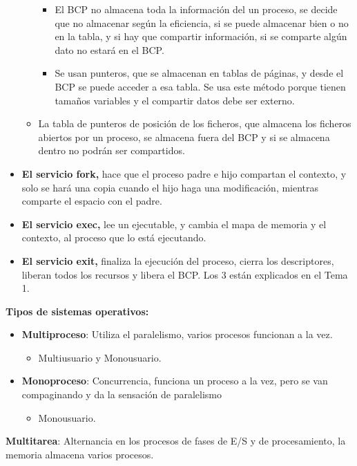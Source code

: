 \documentclass[12pt, twoside, openright]{report} %
\begin{document}
\begin{itemize}
\begin{itemize}
      \begin{itemize}
      \item El BCP no almacena toda la información del un proceso, se decide
        que no almacenar según la eficiencia, si se puede almacenar bien
        o no en la tabla, y si hay que compartir información, si se
        comparte algún dato no estará en el BCP.
        
      \item Se usan punteros, que se almacenan en tablas de páginas, y desde
        el BCP se puede acceder a esa tabla. Se usa este método porque
        tienen tamaños variables y el compartir datos debe ser externo.
        
      \end{itemize}
    \item La tabla de punteros de posición de los ficheros, que almacena los
      ficheros abiertos por un proceso, se almacena fuera del BCP y si se
      almacena dentro no podrán ser compartidos.
      
    \end{itemize}
  \item \textbf{El servicio fork,} hace que el proceso padre e hijo
    compartan el contexto, y solo se hará una copia cuando el hijo haga
    una modificación, mientras comparte el espacio con el padre.
    
  \item \textbf{El servicio exec,} lee un ejecutable, y cambia el mapa de
    memoria y el contexto, al proceso que lo está ejecutando.
    
  \item \textbf{El servicio exit,} finaliza la ejecución del proceso, cierra
    los descriptores, liberan todos los recursos y libera el BCP. Los 3
    están explicados en el Tema 1.
    
  \end{itemize}
\textbf{Tipos de sistemas operativos:}
  

  \begin{itemize}
  \item \textbf{Multiproceso}: Utiliza el paralelismo, varios procesos
    funcionan a la vez.
    

    \begin{itemize}
    \item Multiusuario y Monousuario.
      
    \end{itemize}
  \item \textbf{Monoproceso}: Concurrencia, funciona un proceso a la vez,
    pero se van compaginando y da la sensación de paralelismo
    

    \begin{itemize}
    \item Monousuario.
      
    \end{itemize}
  \end{itemize}
  \pagebreak
\textbf{Multitarea}: Alternancia en los procesos de fases de E/S y de
  procesamiento, la memoria almacena varios procesos.
  
\end{document}
